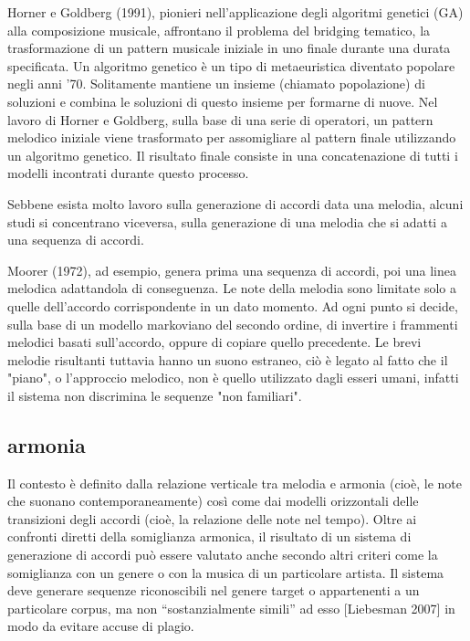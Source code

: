 \documentclass[a4paper,12pt]{report}
\begin{document}
Horner e Goldberg (1991), pionieri nell'applicazione degli algoritmi genetici (GA) alla composizione musicale, affrontano il problema del bridging tematico, la trasformazione di un pattern musicale iniziale in uno finale durante una durata specificata. 
Un algoritmo genetico è un tipo di metaeuristica diventato popolare negli anni '70. 
Solitamente mantiene un insieme (chiamato popolazione) di soluzioni e combina le soluzioni di questo insieme per formarne di nuove. 
Nel lavoro di Horner e Goldberg, sulla base di una serie di operatori, un pattern melodico iniziale viene trasformato per assomigliare al pattern finale utilizzando un algoritmo genetico. 
Il risultato finale consiste in una concatenazione di tutti i modelli incontrati durante questo processo.

Sebbene esista molto lavoro sulla generazione di accordi data una melodia, alcuni studi si concentrano viceversa, sulla generazione di una melodia che si adatti a una sequenza di accordi.

Moorer (1972), ad esempio, genera prima una sequenza di accordi, poi una linea melodica adattandola di conseguenza.
Le note della melodia sono limitate solo a quelle dell'accordo corrispondente in un dato momento. 
Ad ogni punto si decide, sulla base di un modello markoviano del secondo ordine, di invertire i frammenti melodici basati sull'accordo, oppure di copiare quello precedente.
Le brevi melodie risultanti tuttavia hanno un suono estraneo, ciò è legato al fatto che il "piano", o l'approccio melodico, non è quello utilizzato dagli esseri umani, infatti il sistema non discrimina le sequenze "non familiari".

\subsection*{armonia}

Il contesto è definito dalla relazione verticale tra melodia e armonia (cioè, le note che suonano contemporaneamente) così come dai modelli orizzontali delle transizioni degli accordi (cioè, la relazione delle note nel tempo).
Oltre ai confronti diretti della somiglianza armonica, il risultato di un sistema di generazione di accordi può essere valutato anche secondo altri criteri come la somiglianza con un genere o con la musica di un particolare artista.
Il sistema deve generare sequenze riconoscibili nel genere target o appartenenti a un particolare corpus, ma non “sostanzialmente simili” ad esso [Liebesman 2007] in modo da evitare accuse di plagio.
\end{document}
